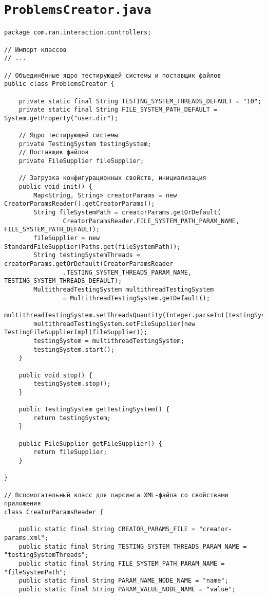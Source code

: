 \section*{\texttt{ProblemsCreator.java}}
\begin{verbatim}
package com.ran.interaction.controllers;

// Импорт классов
// ...

// Объединённые ядро тестирующей системы и поставщик файлов
public class ProblemsCreator {

    private static final String TESTING_SYSTEM_THREADS_DEFAULT = "10";
    private static final String FILE_SYSTEM_PATH_DEFAULT = System.getProperty("user.dir");

    // Ядро тестирующей системы
    private TestingSystem testingSystem;
    // Поставщик файлов
    private FileSupplier fileSupplier;

    // Загрузка конфигурационных свойств, инициализация
    public void init() {
        Map<String, String> creatorParams = new CreatorParamsReader().getCreatorParams();
        String fileSystemPath = creatorParams.getOrDefault(
                CreatorParamsReader.FILE_SYSTEM_PATH_PARAM_NAME, FILE_SYSTEM_PATH_DEFAULT);
        fileSupplier = new StandardFileSupplier(Paths.get(fileSystemPath));
        String testingSystemThreads = creatorParams.getOrDefault(CreatorParamsReader
                .TESTING_SYSTEM_THREADS_PARAM_NAME, TESTING_SYSTEM_THREADS_DEFAULT);
        MultithreadTestingSystem multithreadTestingSystem
                = MultithreadTestingSystem.getDefault();
        multithreadTestingSystem.setThreadsQuantity(Integer.parseInt(testingSystemThreads));
        multithreadTestingSystem.setFileSupplier(new TestingFileSupplierImpl(fileSupplier));
        testingSystem = multithreadTestingSystem;
        testingSystem.start();
    }

    public void stop() {
        testingSystem.stop();
    }

    public TestingSystem getTestingSystem() {
        return testingSystem;
    }

    public FileSupplier getFileSupplier() {
        return fileSupplier;
    }

}

// Вспомогательный класс для парсинга XML-файла со свойствами приложения
class CreatorParamsReader {

    public static final String CREATOR_PARAMS_FILE = "creator-params.xml";
    public static final String TESTING_SYSTEM_THREADS_PARAM_NAME = "testingSystemThreads";
    public static final String FILE_SYSTEM_PATH_PARAM_NAME = "fileSystemPath";
    public static final String PARAM_NAME_NODE_NAME = "name";
    public static final String PARAM_VALUE_NODE_NAME = "value";


\end{verbatim}
